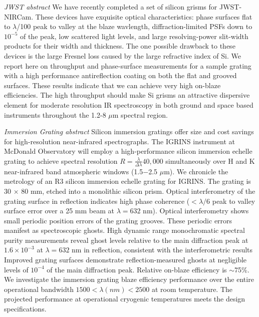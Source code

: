 \documentclass[12pt]{report}	%
\begin{document}
%
\utabstract
{}%
\indent

\emph{JWST abstract}
We have recently completed a set of silicon grisms for JWST-NIRCam.  These devices have exquisite optical characteristics: phase surfaces flat to $\lambda$/100 peak to valley at the blaze wavlength, diffraction-limited PSFs down to $10^{-5}$ of the peak, low scattered light levels, and large resolving-power slit-width products for their width and thickness.  The one possible drawback to these devices is the large Fresnel loss caused by the large refractive index of Si.  We report here on throughput and phase-surface measurements for a sample grating with a high performance antireflection coating on both the flat and grooved surfaces. These results indicate that we can achieve very high on-blaze efficiencies.  The high throughput should make Si grisms an attractive dispersive element for moderate resolution IR spectroscopy in both ground and space based instruments throughout the 1.2-8 $\mu$m spectral region.

\emph{Immersion Grating abstract}
Silicon immersion gratings offer size and cost savings for high-resolution near-infrared spectrographs.  The IGRINS instrument at McDonald Observatory will employ a high-performance silicon immersion echelle grating to achieve spectral resolution $R=\frac{\lambda}{\Delta \lambda}40,000$ simultaneously over H and K near-infrared band atmospheric windows (1.5$-$2.5 $\mu$m).  We chronicle the metrology of an R3 silicon immersion echelle grating for IGRINS.  The grating is 30 $\times$ 80 mm, etched into a monolithic silicon prism.  Optical interferometry of the grating surface in reflection indicates high phase coherence ($< \lambda/6$ peak to valley surface error over a 25 mm beam at $\lambda=632$ nm).  Optical interferometry shows small periodic position errors of the grating grooves.  These periodic errors manifest as spectroscopic ghosts.  High dynamic range monochromatic spectral purity measurements reveal ghost levels relative to the main diffraction peak at $1.6 \times 10^{-3}$ at $\lambda = 632$ nm in reflection, consistent with the interferometric results  Improved grating surfaces demonstrate reflection-measured ghosts at negligible levels of $10^{-4}$ of the main diffraction peak.  Relative on-blaze efficiency is $\sim$75\%.  We investigate the immersion grating blaze efficiency performance over the entire operational bandwidth $1500 < \lambda(nm) < 2500$ at room temperature.  The projected performance at operational cryogenic temperatures meets the design specifications.
\end{document}
